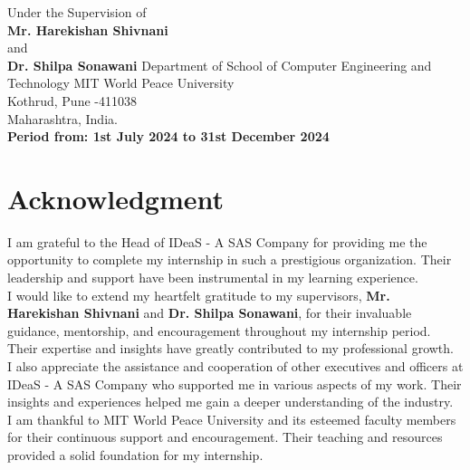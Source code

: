\documentclass[openany, 11pt]{report} %
\begin{document}
\begin{titlepage}
    \vspace{0.5\baselineskip} %
    Under the Supervision of\\
    \Large{
        \textbf{Mr. Harekishan Shivnani}\\
        and \\
        \textbf{Dr. Shilpa Sonawani}
    }
    \vfill
    \vspace{0.5\baselineskip} %
    \LARGE{
        Department of School of Computer Engineering and Technology
    }
    \vspace{0.5\baselineskip} %
    \Large {MIT World Peace University\\
        Kothrud, Pune -411038\\
        Maharashtra, India.\\
    }
    \Large{\textbf{Period from: 1st July 2024 to 31st December 2024}}

\end{titlepage}


\tableofcontents
\thispagestyle{empty}
\clearpage

\chapter*{Acknowledgment}
\thispagestyle{empty}
I am grateful to the Head of IDeaS - A SAS Company for providing me the opportunity to complete my internship in such a prestigious organization. Their leadership and support have been instrumental in my learning experience.\\

I would like to extend my heartfelt gratitude to my supervisors, \textbf{Mr. Harekishan Shivnani} and \textbf{Dr. Shilpa Sonawani}, for their invaluable guidance, mentorship, and encouragement throughout my internship period. Their expertise and insights have greatly contributed to my professional growth.\\

I also appreciate the assistance and cooperation of other executives and officers at IDeaS - A SAS Company who supported me in various aspects of my work. Their insights and experiences helped me gain a deeper understanding of the industry.\\

I am thankful to MIT World Peace University and its esteemed faculty members for their continuous support and encouragement. Their teaching and resources provided a solid foundation for my internship.\\
\end{document}

